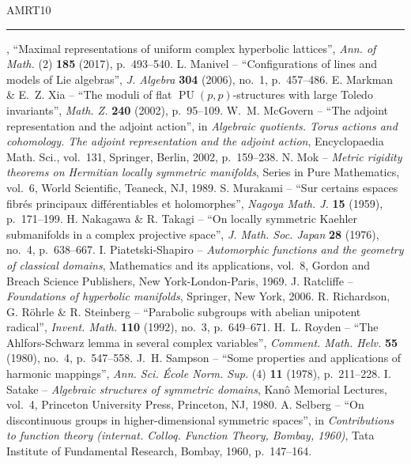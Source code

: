 \documentclass[10pt]{article}
\theoremstyle{definition}
\numberwithin{equation}{section}
\begin{document}
{\begin{thebibliography}{AMRT10}
 \rule{1.2em}{.1pt}, ``Maximal representations of uniform complex hyperbolic lattices'', \emph{Ann. of Math.} (2) \textbf{185} (2017), p.~493--540.
 L. Manivel -- ``Configurations of lines and models of Lie algebras'', \emph{J. Algebra} \textbf{304} (2006), no.~1, p.~457--486.
 E. Markman \& E.~Z. Xia -- ``The moduli of flat $\operatorname{PU}(p,p)$-structures with large Toledo invariants'', \emph{Math. Z.} \textbf{240} (2002), p.~95--109.
 W.~M. McGovern -- ``The adjoint representation and the adjoint action'', in \emph{Algebraic quotients. Torus actions and cohomology. The adjoint representation and the adjoint action}, Encyclopaedia Math. Sci., vol.~131, Springer, Berlin, 2002, p.~159--238.
 N. Mok -- \emph{Metric rigidity theorems on Hermitian locally symmetric manifolds}, Series in Pure Mathematics, vol.~6, World Scientific, Teaneck, NJ, 1989.
 S. Murakami -- ``Sur certains espaces fibrés principaux différentiables et holomorphes'', \emph{Nagoya Math. J.} \textbf{15} (1959), p.~171--199.
 H. Nakagawa \& R. Takagi -- ``On locally symmetric Kaehler submanifolds in a complex projective space'', \emph{J. Math. Soc. Japan} \textbf{28} (1976), no.~4, p.~638--667.
 I. Piatetski-Shapiro -- \emph{Automorphic functions and the geometry of classical domains}, Mathematics and its applications, vol.~8, Gordon and Breach Science Publishers, New York-London-Paris, 1969.
 J. Ratcliffe -- \emph{Foundations of hyperbolic manifolds}, Springer, New York, 2006.
 R. Richardson, G. Röhrle \& R. Steinberg -- ``Parabolic subgroups with abelian unipotent radical'', \emph{Invent. Math.} \textbf{110} (1992), no.~3, p.~649--671.
 H.~L. Royden -- ``The Ahlfors-Schwarz lemma in several complex variables'', \emph{Comment. Math. Helv.} \textbf{55} (1980), no.~4, p.~547--558.
 J.~H. Sampson -- ``Some properties and applications of harmonic mappings'', \emph{Ann. Sci. École Norm. Sup.} (4) \textbf{11} (1978), p.~211--228.
 I. Satake -- \emph{Algebraic structures of symmetric domains}, Kanô Memorial Lectures, vol.~4, Princeton University Press, Princeton, NJ, 1980.
 A. Selberg -- ``On discontinuous groups in higher-dimensional symmetric spaces'', in \emph{Contributions to function theory (internat. Colloq. Function Theory, Bombay, 1960)}, Tata Institute of Fundamental Research, Bombay, 1960, p.~147--164.

\end{thebibliography}}
\end{document}
